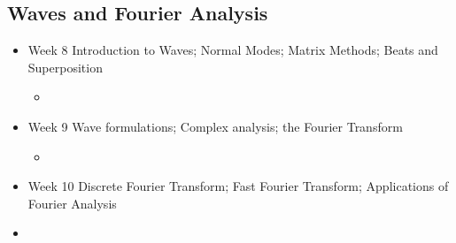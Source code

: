 \documentclass[letterpaper,10pt,english]{jupyterBook}
\begin{document}
\subsection{Waves and Fourier Analysis}
\label{\detokenize{content/0_course/5_calendar:waves-and-fourier-analysis}}\begin{itemize}
\item {} 
\sphinxAtStartPar
Week 8 \sphinxhyphen{} Introduction to Waves; Normal Modes; Matrix Methods; Beats and Superposition
\begin{itemize}
\item {} 
\sphinxAtStartPar
{}

\end{itemize}

\item {} 
\sphinxAtStartPar
Week 9 \sphinxhyphen{} Wave formulations; Complex analysis; the Fourier Transform
\begin{itemize}
\item {} 
\sphinxAtStartPar
{}

\end{itemize}

\item {} 
\sphinxAtStartPar
Week 10 \sphinxhyphen{} Discrete Fourier Transform; Fast Fourier Transform; Applications of Fourier Analysis

\item {} 
\sphinxAtStartPar
{}

\end{itemize}
\end{document}
